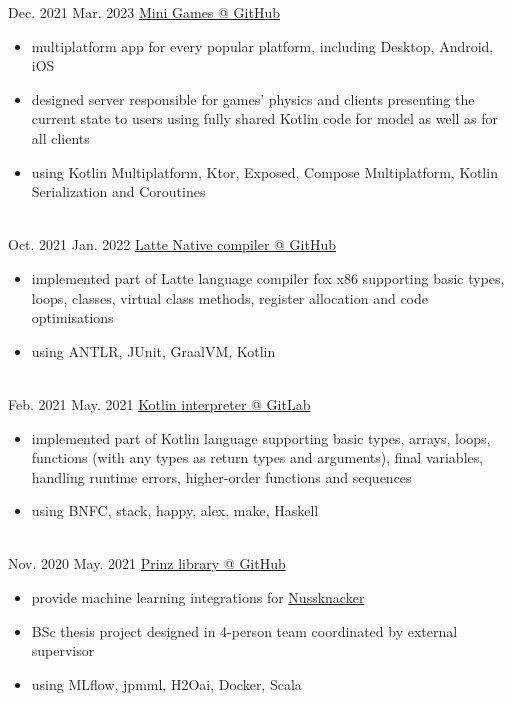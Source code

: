 \documentclass[a4paper]{twentysecondcv} %
\begin{document}
    \begin{twenty}
      \twentyitem
      {Dec. 2021}
      {Mar. 2023}
      {\href{https://github.com/avan1235/mini-games}{Mini Games {\footnotesize @ GitHub}}}
      {}
      {}
      {\begin{itemize}
         \item multiplatform app for every popular platform, including Desktop, Android, iOS
         \item designed server responsible for games' physics and clients presenting the current state to users using fully shared Kotlin code for model as well as for all clients
         \item using Kotlin Multiplatform, Ktor, Exposed, Compose Multiplatform, Kotlin Serialization and Coroutines
      \end{itemize}}
      \\
        \twentyitem
        {Oct. 2021}
        {Jan. 2022}
        {\href{https://github.com/avan1235/latte-compiler}{Latte Native compiler {\footnotesize @ GitHub}}}
        {}
        {}
        {\begin{itemize}
             \item implemented part of Latte language compiler fox x86 supporting basic types, loops, classes,
             virtual class methods, register allocation and code optimisations
             \item using ANTLR, JUnit, GraalVM, Kotlin
        \end{itemize}}
        \\
        \twentyitem
        {Feb. 2021}
        {May. 2021}
        {\href{https://gitlab.com/avan1235/kotlin-interpreter}{Kotlin interpreter {\footnotesize @ GitLab}}}
        {}
        {}
        {\begin{itemize}
             \item implemented part of Kotlin language supporting basic types, arrays, loops, functions
             (with any types as return types and arguments), final variables,
             handling runtime errors, higher-order functions and sequences
             \item using BNFC, stack, happy, alex, make, Haskell
        \end{itemize}}
        \\
        \twentyitem
        {Nov. 2020}
        {May. 2021}
        {\href{https://github.com/prinz-nussknacker/prinz}{Prinz library {\footnotesize @ GitHub}}}
        {}
        {}
        {\begin{itemize}
             \item provide machine learning integrations for \href{https://github.com/TouK/nussknacker}{Nussknacker}
             \item BSc thesis project designed in 4-person team coordinated by external supervisor
             \item using MLflow, jpmml, H2Oai, Docker, Scala
        \end{itemize}}
        \\
    \end{twenty}
\end{document}
